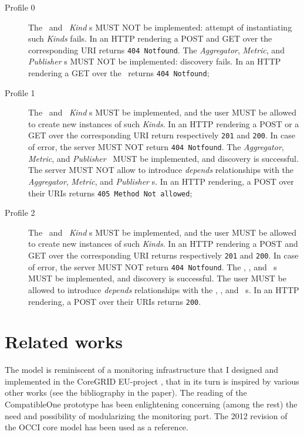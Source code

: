 \documentclass[10pt]{article}  %
\begin{document}
\begin{description}

\item[Profile 0] The \coll\ and \sens\ {\em Kind} s MUST NOT be implemented: attempt of instantiating such {\em Kinds} fails.  In an HTTP rendering a POST and GET over the corresponding URI returns {\tt 404 Notfound}. The {\em Aggregator}, {\em Metric}, and {\em Publisher} \mi s MUST NOT be implemented: discovery fails. In an HTTP rendering a GET over the \mi\ returns {\tt 404 Notfound}; 

\item[Profile 1] The \coll\ and \sens\ {\em Kind} s MUST be implemented, and the user MUST be allowed to create new instances of such {\em Kinds}.  In an HTTP rendering a POST or a GET over the corresponding URI return respectively {\tt 201} and {\tt 200}. In case of error, the server MUST NOT return {\tt 404 Notfound}. The {\em Aggregator}, {\em Metric}, and {\em Publisher} \mi\ MUST be implemented, and discovery is successful. The server MUST NOT allow to introduce {\em depends} relationships with the {\em Aggregator}, {\em Metric}, and {\em Publisher} \mi s. In an HTTP rendering, a POST over their URIs returns {\tt 405 Method Not allowed}; 

\item[Profile 2]  The \coll\ and \sens\ {\em Kind} s MUST be implemented, and the user MUST be allowed to create new instances of such {\em Kinds}.  In an HTTP rendering a POST and GET over the corresponding URI returns respectively {\tt 201} and {\tt 200}. In case of error, the server MUST NOT return {\tt 404 Notfound}. The \aggr , \metr , and \publ\ \mi s MUST be implemented, and discovery is successful. The user MUST be allowed to introduce {\em depends} relationships with the  \aggr , \metr , and \publ\ \mi s. In an HTTP rendering, a POST over their URIs returns {\tt 200}.

\end{description}

\section{Related works}

The model is reminiscent of a monitoring infrastructure that I designed and implemented in the CoreGRID EU-project \cite{cur:08:a}, that in its turn is inspired by various other works (see the bibliography in the paper). The reading of the CompatibleOne prototype \cite{mar12a} has been enlightening concerning (among the rest) the need and possibility of modularizing the monitoring part. The 2012 revision of the OCCI core model \cite{occi:core} has been used as a reference.
\end{document}
